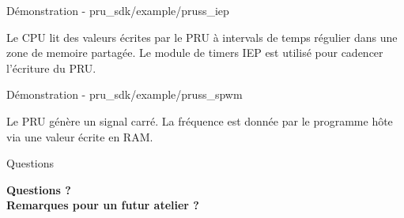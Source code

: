 \documentclass{beamer}
\begin{document}
\begin{frame}{D\'emonstration - pru\_sdk/example/pruss\_iep}
  \begin{small}
    Le CPU lit des valeurs \'ecrites par le PRU \`a intervals de
    temps r\'egulier dans une zone de memoire partag\'ee. Le module
    de timers IEP est utilis\'e pour cadencer l'\'ecriture du PRU.
  \end{small}
\end{frame}


\begin{frame}{D\'emonstration - pru\_sdk/example/pruss\_spwm}
  \begin{small}
    Le PRU g\'en\`ere un signal carr\'e. La fr\'equence est donn\'ee
    par le programme h\^ote via une valeur \'ecrite en RAM.
  \end{small}
\end{frame}


\begin{frame}{Questions}
  \begin{center}
    \textbf{Questions ?} \\
    \textbf{Remarques pour un futur atelier ?}
  \end{center}
\end{frame}
\end{document}
